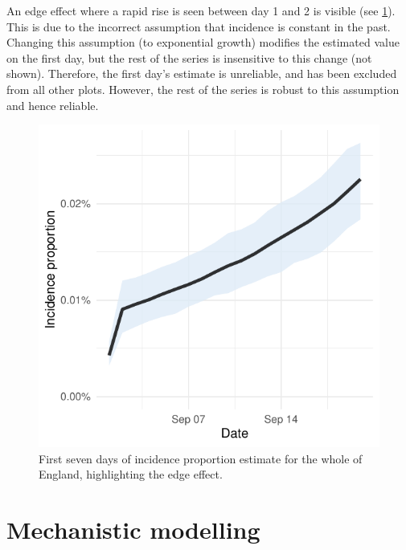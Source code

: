\documentclass[thesis.tex]{subfiles}
\begin{document}
An edge effect where a rapid rise is seen between day 1 and 2 is visible (see \cref{transmission:fig:backcalc-start-effect}).
This is due to the incorrect assumption that incidence is constant in the past.
Changing this assumption (\eg to exponential growth) modifies the estimated value on the first day, but the rest of the series is insensitive to this change (not shown).
Therefore, the first day's estimate is unreliable, and has been excluded from all other plots.
However, the rest of the series is robust to this assumption and hence reliable.
\begin{figure}
    \centering \includegraphics{transmission/backcalc-start-effect}
    \caption[Edge effects in backcalculation method]{%
        First seven days of incidence proportion estimate for the whole of England, highlighting the edge effect.
    }
    \label{transmission:fig:backcalc-start-effect}
\end{figure}


\section{Mechanistic modelling} \label{SEIR}
\end{document}
